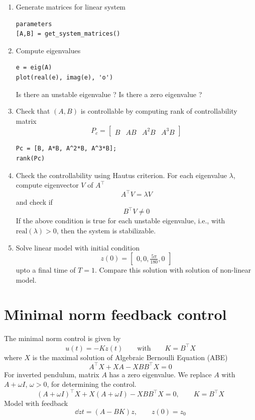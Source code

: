 \documentclass[12pt]{article}
\begin{document}
\begin{enumerate}

\item Generate matrices for linear system
\begin{lstlisting}
parameters
[A,B] = get_system_matrices()
\end{lstlisting}

\item Compute eigenvalues
\begin{lstlisting}
e = eig(A)
plot(real(e), imag(e), 'o')
\end{lstlisting}
Is there an unstable eigenvalue ? Is there a zero eigenvalue ?

\item Check that $(A,B)$ is controllable by computing rank of controllability matrix
\[
P_c = \begin{bmatrix} 
B & A B & A^2 B & A^3 B
\end{bmatrix}
\]
\begin{lstlisting}
Pc = [B, A*B, A^2*B, A^3*B];
rank(Pc)
\end{lstlisting}

\item Check the controllability using Hautus criterion. For each eigenvalue $\lambda$, compute eigenvector $V$ of $A^\top$
\[
A^\top V = \lambda V
\]
and check if 
\[
B^\top V \ne 0
\]
If the above condition is true for each unstable eigenvalue, i.e., with $\mbox{real}(\lambda) > 0$, then the system is stabilizable.

\item Solve linear model with initial condition 
\[
z(0) = \begin{bmatrix} 0, 0, \frac{5\pi}{180}, 0 \end{bmatrix}
\]
upto a final time of $T=1$. Compare this solution with solution of non-linear model.

\end{enumerate}
\section{Minimal norm feedback control}
The minimal norm control is given by
\[
u(t) = - K z (t) \qquad\mbox{with}\qquad K = B^\top X
\]
where $X$ is the maximal solution of Algebraic Bernoulli Equation (ABE)
\[
A^\top X + X A - X B B^\top X = 0
\]
For inverted pendulum, matrix $A$ has a zero eigenvalue. We replace $A$ with $A+\omega I$, $\omega > 0$, for determining the control.
\[
(A+\omega I)^\top X + X (A+\omega I) - X B B^\top X = 0, \qquad K = B^\top X
\]
Model with feedback
\[
\dd{z}{t} = (A - BK)z, \qquad z(0) = z_0
\]
\end{document}

